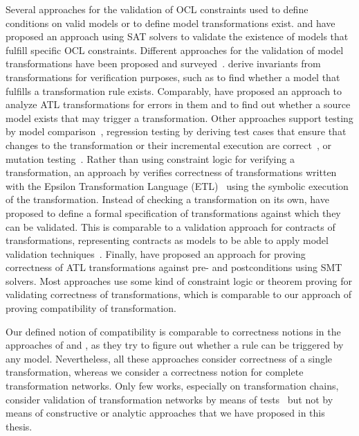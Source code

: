 Several approaches for the validation of \gls{OCL} constraints used to define conditions on valid models or to define model transformations exist.
\textcite{kuhlmann2011a} and \textcite{gonzalez2012a} have proposed an approach using SAT solvers to validate the existence of models that fulfill specific \gls{OCL} constraints.
Different approaches for the validation of model transformations have been proposed and surveyed~\cite{calegari2013verificationTransformations-ENTCS,rahim2015SurveyTransformationVerification-SoSym}.
\textcite{cabot2010VerificationInvariants-JSS} derive invariants from transformations for verification purposes, such as to find whether a model that fulfills a transformation rule exists.
Comparably, \textcite{cuadrado2017tse} have proposed an approach to analyze \gls{ATL} transformations for errors in them and to find out whether a source model exists that may trigger a transformation.
Other approaches support testing by model comparison~\cite{kolovos2006transformationTesting-WGIMM}, regression testing by deriving test cases that ensure that changes to the transformation or their incremental execution are correct~\cite{troy2018inferenceTransformations-JSS}, or mutation testing~\cite{troya2015imutationTestingTransformations-ICSTW}.
Rather than using constraint logic for verifying a transformation, an approach by \textcite{azizi2017ContractVerification-ICCKE} verifies correctness of transformations written with the Epsilon Transformation Language (ETL)~\cite{kolovos2014epsilon-Book} using the symbolic execution of the transformation.
Instead of checking a transformation on its own, \textcite{vallecillo2012FormalTesting-FMMDE} have proposed to define a formal specification of transformations against which they can be validated.
This is comparable to a validation approach for contracts of transformations, representing contracts as models to be able to apply model validation techniques~\cite{braga2014consistencyTransformations-SCP}.
Finally, \textcite{buettner2012models} have proposed an approach for proving correctness of \gls{ATL} transformations against pre- and postconditions using \gls{SMT} solvers.
Most approaches use some kind of constraint logic or theorem proving for validating correctness of transformations, which is comparable to our approach of proving compatibility of transformation.

Our defined notion of compatibility is comparable to correctness notions in the approaches of \textcite{cuadrado2017tse} and \textcite{cabot2010VerificationInvariants-JSS}, as they try to figure out whether a rule can be triggered by any model.
Nevertheless, all these approaches consider correctness of a single transformation, whereas we consider a correctness notion for complete transformation networks.
Only few works, especially on transformation chains, consider validation of transformation networks by means of tests~\cite{bauer2011combiningCoverageChains-ICMT} but not by means of constructive or analytic approaches that we have proposed in this thesis.



